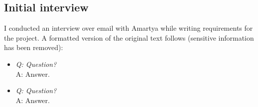 \subsection{Initial interview}

I conducted an interview over email with Amartya while writing requirements for
the project. A formatted version of the original text follows (sensitive
information has been removed):

\newcommand{\qu}[1]{\item\textit{Q: #1 \\}}
\newcommand{\ans}[1]{A: #1}

\begin{itemize}
\qu{Question?}
\ans{Answer.}

\qu{Question?}
\ans{Answer.}
\end{itemize}
